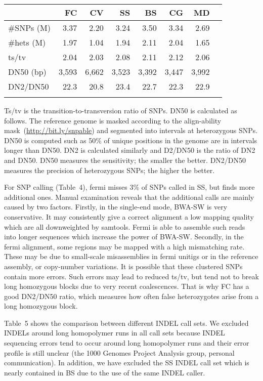 \documentclass{bioinfo}
\begin{document}
\begin{table}[b]
{\begin{tabular}{p{2.3cm}rrrrrrr}
\toprule
& FC & CV & SS & BS & CG & MD \\
\midrule
\#SNPs (M) & 3.37 & 2.20 & 3.24 & 3.50 & 3.34 & 2.69\\
\#hets (M) & 1.97 & 1.04 & 1.94 & 2.11 & 2.04 & 1.65\\
ts/tv      & 2.04 & 2.03 & 2.08 & 2.11 & 2.12 & 2.06\\
DN50 (bp)  & 3,593& 6,662& 3,523& 3,392& 3,447&3,992\\
DN2/DN50   & 22.3 & 20.8 & 23.4 & 22.7 & 22.3 & 22.9\\
\botrule
\end{tabular}}{Ts/tv is the transition-to-transversion ratio of SNPs. DN50 is
calculated as follows. The reference genome is masked according to the
align-ability mask~(\href{http://bit.ly/snpable}{http://bit.ly/snpable}) and segmented into intervals at
heterozygous SNPs. DN50 is computed such as 50\% of unique positions in the
genome are in intervals longer than DN50. DN2 is calculated similarly and
D2/DN50 is the ratio of DN2 and DN50. DN50 measures the sensitivity; the
smaller the better.  DN2/DN50 measures the precision of heterozygous SNPs; the
higher the better.}

\end{table}

For SNP calling (Table~4), fermi misses 3\% of SNPs called in SS,
but finds more additional ones. Manual examination reveals that
the additional calls are mainly caused by two factors. Firstly, in the
single-end mode, BWA-SW is very conservative. It may consistently give a
correct alignment a low mapping quality which are all downweighted by samtools.
Fermi is able to assemble such reads into
longer sequences which increase the power of BWA-SW. Secondly, in the fermi
alignment, some regions may be mapped with a high mismatching rate.  These may
be due to small-scale misassemblies in fermi unitigs or in the reference
assembly, or copy-number variations. It is possible that these clustered
SNPs contain more errors. Such errors may lead to reduced ts/tv, but tend
not to break long homozygous blocks due to very recent coalescences. That
is why FC has a good DN2/DN50 ratio, which measures how often false heterozygotes
arise from a long homozygous block.

Table~5 shows the comparison between different INDEL call sets. We excluded
INDELs around long homopolymer runs in all call sets because INDEL sequencing
errors tend to occur around long homopolymer runs and their error profile is still unclear
(the 1000 Genomes Project Analysis group, personal communication). In addition,
we have excluded the SS INDEL call set which is nearly contained in BS due to
the use of the same INDEL caller.
\end{document}
